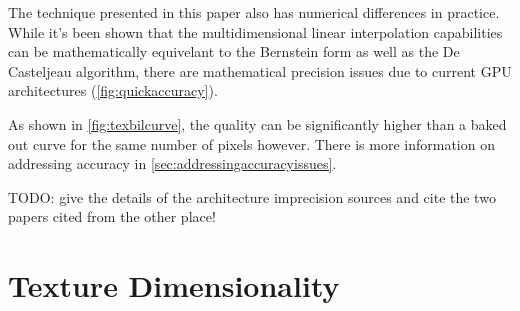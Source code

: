 \documentclass{jcgt}
\begin{document}
The technique presented in this paper also has numerical differences in practice.  While it's been shown that the multidimensional linear interpolation capabilities can be mathematically equivelant to the Bernstein form as well as the De Casteljeau algorithm, there are mathematical precision issues due to current GPU architectures (\autoref{fig:quickaccuracy}).

As shown in \autoref{fig:texbilcurve}, the quality can be significantly higher than a baked out curve for the same number of pixels however.  There is more information on addressing accuracy in \autoref{sec:addressingaccuracyissues}.

TODO: give the details of the architecture imprecision sources and cite the two papers cited from the other place!

\section{Texture Dimensionality}
\label{sec:texturedimensionality}

\newcommand*\circled[1]{\tikz[baseline=(char.base)]{
            \node[shape=circle,draw] (char) {#1};}}
\end{document}

